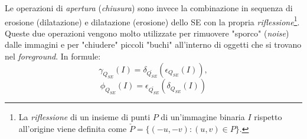Le operazioni di \textit{apertura} (\textit{chiusura}) sono invece la combinazione in sequenza di erosione (dilatazione) e dilatazione (erosione) dello SE con la propria \textit{riflessione}\footnote{La \textit{riflessione} di un insieme di punti $P$ di un'immagine binaria $I$ rispetto all'origine viene definita come $\check{P}=\{(-u,-v) \colon (u,v)\in P\}$.}. Queste due operazioni vengono molto utilizzate per rimuovere "sporco" (\textit{noise}) dalle immagini e per "chiudere" piccoli "buchi" all'interno di oggetti che si trovano nel \textit{foreground}. In formule:
\begin{equation}
	\label{eq:opening}
	\gamma_{Q_{SE}}(I) = \delta_{\check{Q_{SE}}}(\epsilon_{Q_{SE}}(I)),
\end{equation}
\begin{equation}
	\label{eq:closing}
	\phi_{Q_{SE}}(I) = \epsilon_{\check{Q_{SE}}}(\delta_{Q_{SE}}(I))
\end{equation}

